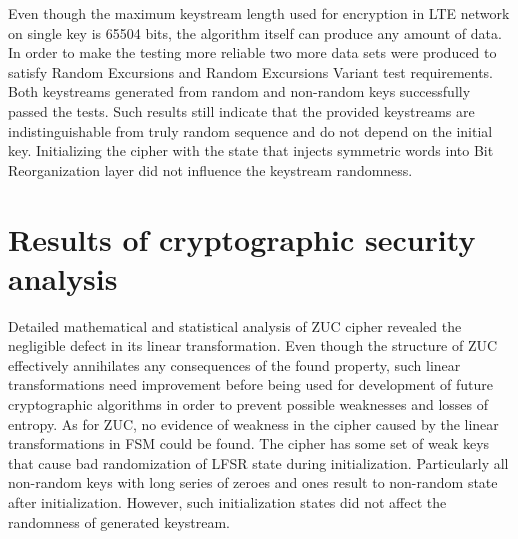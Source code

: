 Even though the maximum keystream length used for encryption in LTE network on
single key is 65504 bits, the algorithm itself can produce any amount of data.
In order to make the testing more reliable two more data sets were produced to
satisfy Random Excursions and Random Excursions Variant test requirements. Both
keystreams generated from random and non-random keys successfully passed the
tests. Such results still indicate that the provided keystreams are
indistinguishable from truly random sequence and do not depend on the initial
key. Initializing the cipher with the state that injects symmetric words into
Bit Reorganization layer did not influence the keystream randomness.

\section{Results of cryptographic security analysis}

Detailed mathematical and statistical analysis of ZUC cipher revealed the
negligible defect in its linear transformation. Even though the structure of
ZUC effectively annihilates any consequences of the found property, such linear
transformations need improvement before being used for development of future
cryptographic algorithms in order to prevent possible weaknesses and losses of
entropy. As for ZUC, no evidence of weakness in the cipher caused by the linear
transformations in FSM could be found. The cipher has some set of weak keys
that cause bad randomization of LFSR state during initialization. Particularly
all non-random keys with long series of zeroes and ones result to non-random
state after initialization. However, such initialization states did not affect
the randomness of generated keystream.
